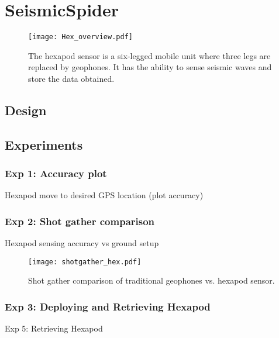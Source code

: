 \section{SeismicSpider}\label{sec:SeismicSpider}
\begin{figure} \centering
  {\texttt{[image: Hex\_overview.pdf]}}
 \caption{The hexapod sensor is a six-legged mobile unit  where three legs are replaced by geophones. It has the ability to sense seismic waves and store the data obtained.} 
 \label{fig:TradvsAutoDrop}
\end{figure}
\subsection{Design}

\subsection{Experiments}
\subsubsection{Exp 1: Accuracy plot}
Hexapod move to desired GPS location  (plot accuracy)\\
\subsubsection{Exp 2: Shot gather comparison}
Hexapod sensing accuracy vs ground setup\\
\begin{figure} \centering
  {\texttt{[image: shotgather\_hex.pdf]}}
 \caption{Shot gather comparison of traditional geophones vs. hexapod sensor. 
 \label{fig:TradvsAutoDrop}}
\end{figure}
\subsubsection{Exp 3: Deploying and Retrieving Hexapod}
Exp 5: Retrieving Hexapod\\